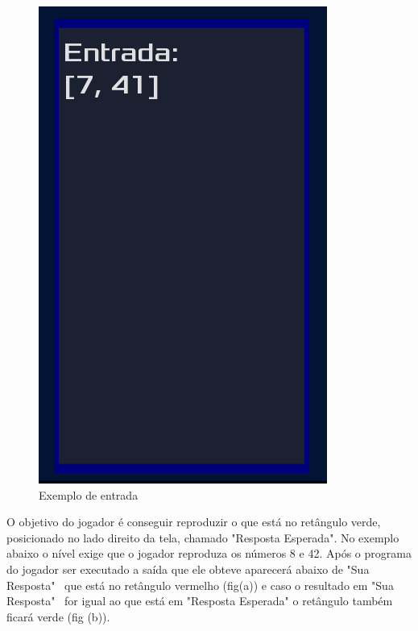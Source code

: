 \begin{figure}[H]
    \includegraphics[scale=0.3]{../figuras/entrada.png}
    \caption{Exemplo de entrada}
\end{figure}

O objetivo do jogador é conseguir reproduzir o que está no retângulo verde, 
posicionado no lado direito da tela,
chamado "Resposta Esperada". No exemplo abaixo o nível exige que o jogador
reproduza os números 8 e 42. Após o programa do jogador ser executado a saída 
que ele obteve aparecerá abaixo de "Sua Resposta" \ que está no retângulo vermelho
(fig(a)) e caso o resultado em "Sua Resposta" \ for igual ao que está em 
"Resposta Esperada" o retângulo também ficará verde (fig (b)).

